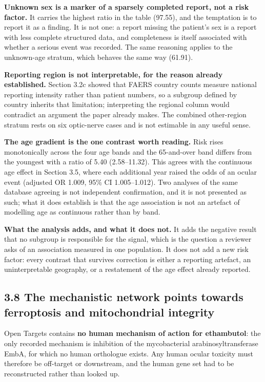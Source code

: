 \documentclass[utf8]{FrontiersinVancouver}
\begin{document}
\textbf{Unknown sex is a marker of a sparsely completed report, not a risk factor.} It carries the highest ratio in the table (97.55), and the temptation is to report it as a finding. It is not one: a report missing the patient's sex is a report with less complete structured data, and completeness is itself associated with whether a serious event was recorded. The same reasoning applies to the unknown-age stratum, which behaves the same way (61.91).

\textbf{Reporting region is not interpretable, for the reason already established.} Section 3.2c showed that FAERS country counts measure national reporting intensity rather than patient numbers, so a subgroup defined by country inherits that limitation; interpreting the regional column would contradict an argument the paper already makes. The combined other-region stratum rests on six optic-nerve cases and is not estimable in any useful sense.

\textbf{The age gradient is the one contrast worth reading.} Risk rises monotonically across the four age bands and the 65-and-over band differs from the youngest with a ratio of 5.40 (2.58--11.32). This agrees with the continuous age effect in Section 3.5, where each additional year raised the odds of an ocular event (adjusted OR 1.009, 95\% CI 1.005--1.012). Two analyses of the same database agreeing is not independent confirmation, and it is not presented as such; what it does establish is that the age association is not an artefact of modelling age as continuous rather than by band.

\textbf{What the analysis adds, and what it does not.} It adds the negative result that no subgroup is responsible for the signal, which is the question a reviewer asks of an association measured in one population. It does not add a new risk factor: every contrast that survives correction is either a reporting artefact, an uninterpretable geography, or a restatement of the age effect already reported.

\subsection{3.8 The mechanistic network points towards ferroptosis and mitochondrial integrity}

Open Targets contains \textbf{no human mechanism of action for ethambutol}: the only recorded mechanism is inhibition of the mycobacterial arabinosyltransferase EmbA, for which no human orthologue exists. Any human ocular toxicity must therefore be off-target or downstream, and the human gene set had to be reconstructed rather than looked up.
\end{document}
